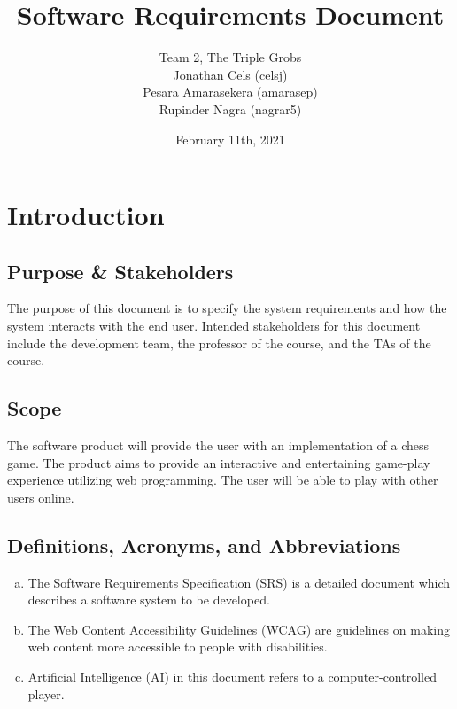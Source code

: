 \documentclass[]{article}
\title{Software Requirements Document}
\begin{document}
\author{Team 2, The Triple Grobs
        \\ Jonathan Cels (celsj)
        \\ Pesara Amarasekera (amarasep)
        \\ Rupinder Nagra (nagrar5)
}
\date{February 11th, 2021}                               


\maketitle	

\section{Introduction}
\label{sec:introduction}

\subsection{Purpose \& Stakeholders}
\label{sub:purpose}
The purpose of this document is to specify the system requirements and how the system interacts with the end user. Intended stakeholders for this document include the development team, the professor of the course, and the TAs of the course.

\subsection{Scope}
\label{sub:scope}
The software product will provide the user with an implementation of a chess game. The product aims to provide an interactive and entertaining game-play experience utilizing web programming. The user will be able to play with other users online.

\subsection{Definitions, Acronyms, and Abbreviations}
\label{sub:definitions_acronyms_and_abbreviations}
\begin{enumerate}[a)]
	\item The Software Requirements Specification (SRS) is a detailed document which describes a software system to be developed.
	\item The Web Content Accessibility Guidelines (WCAG) \cite{WCAG} are guidelines on making web content more accessible to people with disabilities.
	\item Artificial Intelligence (AI) in this document refers to a computer-controlled player.
\end{enumerate}
\end{document}
